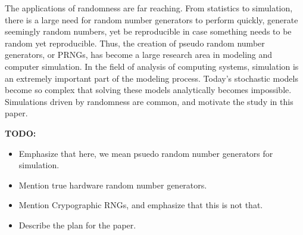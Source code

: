 The applications of randomness are far reaching. From statistics to simulation, there is a large need for random number generators to perform quickly, generate seemingly random numbers, yet be reproducible in case something needs to be random yet reproducible. Thus, the creation of pseudo random number generators, or PRNGs, has become a large research area in modeling and computer simulation. In the field of analysis of computing systems, simulation is an extremely important part of the modeling process. Today's stochastic models become so complex that solving these models analytically becomes impossible. Simulations driven by randomness are common, and motivate the study in this paper.

\textbf{TODO:}
\begin{itemize}
    \item Emphasize that here, we mean psuedo random number generators for simulation.
    \item Mention true hardware random number generators.
    \item Mention Crypographic RNGs, and emphasize that this is not that.
    \item Describe the plan for the paper.
\end{itemize}
